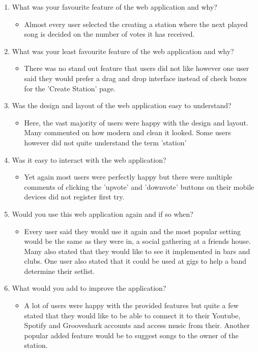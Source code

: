\documentclass[a4paper, 12pt]{report}
\begin{document}
\begin{enumerate}
\item What was your favourite feature of the web application and why?
\begin{itemize}
\item Almost every user selected the creating a station where the next played song is decided on the number of votes it has received.
\end{itemize}
\item What was your least favourite feature of the web application and why?
\begin{itemize}
\item There was no stand out feature that users did not like however one user said they would prefer a drag and drop interface instead of check boxes for the 'Create Station' page.
\end{itemize}
\item Was the design and layout of the web application easy to understand?
\begin{itemize}
\item Here, the vast majority of users were happy with the design and layout. Many commented on how modern and clean it looked. Some users however did not quite understand the term 'station'
\end{itemize}
\item Was it easy to interact with the web application?
\begin{itemize}
\item Yet again most users were perfectly happy but there were multiple comments of clicking the 'upvote' and 'downvote' buttons on their mobile devices did not register first try.
\end{itemize}
\item Would you use this web application again and if so when?
\begin{itemize}
\item Every user said they would use it again and the most popular setting would be the same as they were in, a social gathering at a friends house. Many also stated that they would like to see it implemented in bars and clubs. One user also stated that it could be used at gigs to help a band determine their setlist.
\end{itemize}
\item What would you add to improve the application?
\begin{itemize}
\item A lot of users were happy with the provided features but quite a few stated that they would like to be able to connect it to their Youtube, Spotify and Grooveshark accounts and access music from their. Another popular added feature would be to suggest songs to the owner of the station.
\end{itemize}
\end{enumerate}
\end{document}
